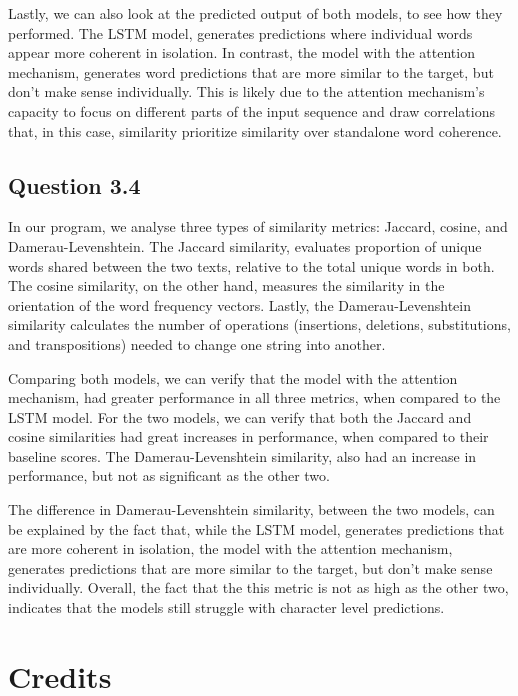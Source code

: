 \documentclass{article}
\begin{document}
Lastly, we can also look at the predicted output of both models, to see how they
performed. The LSTM model, generates predictions where individual words appear
more coherent in isolation. In contrast, the model with the attention mechanism,
generates word predictions that are more similar to the target, but don't make sense
individually. This is likely due to the attention mechanism's capacity to focus on 
different parts of the input sequence and draw correlations that, in this case,
similarity prioritize similarity over standalone word coherence.


\subsection{Question 3.4}
In our program, we analyse three types of similarity metrics: Jaccard, cosine, 
and Damerau-Levenshtein. The Jaccard similarity, evaluates proportion of unique words shared 
between the two texts, relative to the total unique words in both. The cosine similarity, on the other hand, measures  
the similarity in the orientation of the word frequency vectors. Lastly, the Damerau-Levenshtein 
similarity calculates the number of operations (insertions, deletions, substitutions, and transpositions) 
needed to change one string into another.

Comparing both models, we can verify that the model with the attention mechanism, had greater performance
in all three metrics, when compared to the LSTM model. For the two models, we can verify that both the Jaccard 
and cosine similarities had great increases in performance, when compared to their baseline scores. The Damerau-Levenshtein 
similarity, also had an increase in performance, but not as significant as the other two.

The difference in Damerau-Levenshtein similarity, between the two models, can be explained by the fact that,
while the LSTM model, generates predictions that are more coherent in isolation, the model with the attention mechanism,
generates predictions that are more similar to the target, but don't make sense individually. Overall, the fact that the
this metric is not as high as the other two, indicates that the models still struggle with character level predictions.

\section{Credits}
\end{document}
